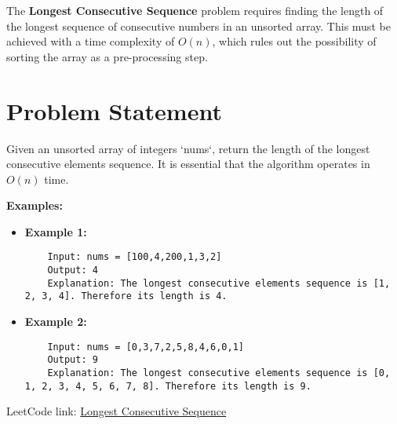
\label{problem:longest_consecutive_sequence}

The \textbf{Longest Consecutive Sequence} problem requires finding the length of the longest sequence of consecutive numbers in an unsorted array. This must be achieved with a time complexity of \(O(n)\), which rules out the possibility of sorting the array as a pre-processing step.

\section*{Problem Statement}
Given an unsorted array of integers `nums`, return the length of the longest consecutive elements sequence. It is essential that the algorithm operates in \(O(n)\) time.

\textbf{Examples:}

\begin{itemize}
	\item \textbf{Example 1:}
	\begin{verbatim}
	Input: nums = [100,4,200,1,3,2]
	Output: 4
	Explanation: The longest consecutive elements sequence is [1, 2, 3, 4]. Therefore its length is 4.
	\end{verbatim}

	\item \textbf{Example 2:}
	\begin{verbatim}
	Input: nums = [0,3,7,2,5,8,4,6,0,1]
	Output: 9
	Explanation: The longest consecutive elements sequence is [0, 1, 2, 3, 4, 5, 6, 7, 8]. Therefore its length is 9.
	\end{verbatim}
\end{itemize}

LeetCode link: \href{https://leetcode.com/problems/longest-consecutive-sequence/}{Longest Consecutive Sequence}


